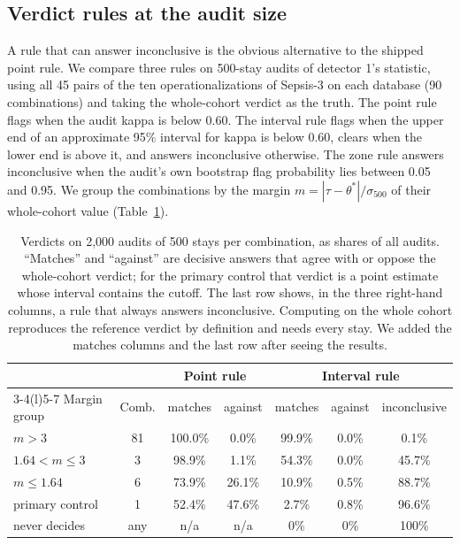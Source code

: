 \documentclass[10pt]{article}
\theoremstyle{definition}
\begin{document}
\subsection{Verdict rules at the audit size}
\label{sec:rules}

A rule that can answer inconclusive is the obvious alternative to the shipped point rule. We compare three rules on 500-stay audits of detector 1's statistic, using all 45 pairs of the ten operationalizations of Sepsis-3 on each database (90 combinations) and taking the whole-cohort verdict as the truth. The point rule flags when the audit kappa is below 0.60. The interval rule flags when the upper end of an approximate 95\% interval for kappa is below 0.60, clears when the lower end is above it, and answers inconclusive otherwise. The zone rule answers inconclusive when the audit's own bootstrap flag probability lies between 0.05 and 0.95. We group the combinations by the margin $m=|\tau-\theta^\ast|/\sigma_{500}$ of their whole-cohort value (Table~\ref{tab:rules}).

\begin{table}[t]
\centering\footnotesize\setlength{\tabcolsep}{4pt}
\begin{tabular}{@{}lcccccc@{}}
\toprule
 & & \multicolumn{2}{c}{Point rule} & \multicolumn{3}{c}{Interval rule}\\
\cmidrule(lr){3-4}\cmidrule(l){5-7}
Margin group & Comb. & matches & against & matches & against & inconclusive\\
\midrule
$m>3$ & 81 & 100.0\% & 0.0\% & 99.9\% & 0.0\% & 0.1\%\\
$1.64<m\le 3$ & 3 & 98.9\% & 1.1\% & 54.3\% & 0.0\% & 45.7\%\\
$m\le 1.64$ & 6 & 73.9\% & 26.1\% & 10.9\% & 0.5\% & 88.7\%\\
primary control & 1 & 52.4\% & 47.6\% & 2.7\% & 0.8\% & 96.6\%\\
\midrule
never decides & any & n/a & n/a & 0\% & 0\% & 100\%\\
\bottomrule
\end{tabular}
\caption{Verdicts on 2,000 audits of 500 stays per combination, as shares of all audits. ``Matches'' and ``against'' are decisive answers that agree with or oppose the whole-cohort verdict; for the primary control that verdict is a point estimate whose interval contains the cutoff. The last row shows, in the three right-hand columns, a rule that always answers inconclusive. Computing on the whole cohort reproduces the reference verdict by definition and needs every stay. We added the matches columns and the last row after seeing the results.}
\label{tab:rules}
\end{table}
\end{document}
